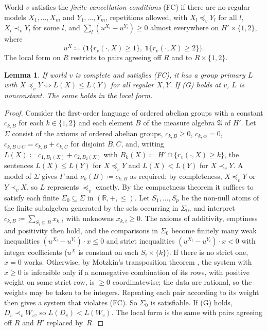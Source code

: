 \documentclass[11pt]{article}
\newtheorem{lemma}[theorem]{Lemma}
\theoremstyle{definition}\newtheorem{definition}[theorem]{Definition}
\theoremstyle{remark}\newtheorem{remark}[theorem]{Remark}
\newcommand{\R}{\mathbb R}
\begin{document}
World $v$ satisfies the \emph{finite cancellation conditions} (FC) if there
are no regular models $X_1,\dots,X_m$ and $Y_1,\dots,Y_m$, repetitions
allowed, with
$X_l\preceq_vY_l$ for all $l$, $X_l\prec_vY_l$ for some $l$, and
$\sum_l(u^{X_l}-u^{Y_l})\ge0$ almost everywhere on $H'\times\{1,2\}$, where
\[
 u^X\coloneqq\bigl(\mathbf 1\{r_v(\cdot,X)\ge1\},\ \mathbf 1\{r_v(\cdot,X)\ge2\}\bigr).
\]
The local form on $R$ restricts to pairs agreeing off $R$ and to
$R\times\{1,2\}$.

\begin{lemma}\label{lem:FC}
If world $v$ is complete and satisfies (FC), it has a group primary $L$ with
$X\preceq_vY\iff L(X)\le L(Y)$ for all regular $X,Y$. If (G) holds at $v$,
$L$ is nonconstant. The same holds in the local form.
\end{lemma}
\begin{proof}
Consider the first-order language of ordered abelian groups with a constant
$c_{k,B}$ for each $k\in\{1,2\}$ and each element $B$ of the measure algebra
$\mathfrak A$ of $H'$. Let $\Sigma$ consist of the axioms of ordered abelian
groups, $c_{k,B}\ge0$, $c_{k,\varnothing}=0$, $c_{k,B\cup C}=c_{k,B}+c_{k,C}$
for disjoint $B,C$, and, writing
$L(X)\coloneqq c_{1,B_1(X)}+c_{2,B_2(X)}$ with
$B_k(X)\coloneqq H'\cap\{r_v(\cdot,X)\ge k\}$, the
sentences $L(X)\le L(Y)$ for $X\preceq_vY$ and $L(X)<L(Y)$ for $X\prec_vY$.
A model of $\Sigma$ gives $\Gamma$ and $\nu_k(B)\coloneqq c_{k,B}$ as required;
by completeness, $X\preceq_vY$ or $Y\prec_vX$, so $L$ represents
$\preceq_v$ exactly. By the compactness theorem it suffices to satisfy each
finite $\Sigma_0\subseteq\Sigma$ in $(\R,+,\le)$. Let $S_1,\dots,S_p$ be the
non-null atoms of the finite subalgebra generated by the sets occurring in
$\Sigma_0$, and interpret $c_{k,B}\coloneqq\sum_{S_i\subseteq B}x_{k,i}$ with
unknowns $x_{k,i}\ge0$. The axioms of additivity, emptiness and positivity
then hold, and the comparisons in $\Sigma_0$ become finitely many weak
inequalities $(u^{X_l}-u^{Y_l})\cdot x\le0$ and strict inequalities
$(u^{X_l}-u^{Y_l})\cdot x<0$ with integer coefficients ($u^X$ is constant on
each $S_i\times\{k\}$). If there is no strict one, $x=0$ works. Otherwise,
by Motzkin's transposition theorem \cite{Motzkin}, the system with $x\ge0$
is infeasible only if a nonnegative combination of its rows, with positive weight on some
strict row, is $\ge0$ coordinatewise; the data are rational, so the weights
may be taken to be integers. Repeating each pair according to its weight
then gives a system that violates (FC). So $\Sigma_0$ is satisfiable. If (G)
holds, $D_v\prec_vW_v$, so $L(D_v)<L(W_v)$. The local form is the same with
pairs agreeing off $R$ and $H'$ replaced by~$R$.
\end{proof}
\end{document}
